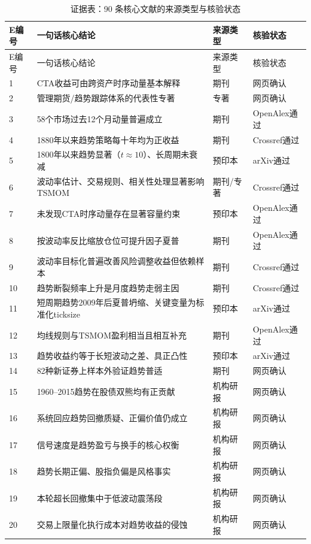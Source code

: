 \documentclass[12pt,a4paper]{ctexart}
\begin{document}
{\small\setlength{\tabcolsep}{4pt}\begin{longtable}{p{28.45pt}p{244.69pt}p{48.37pt}p{85.36pt}}
\caption{证据表：90 条核心文献的来源类型与核验状态}\label{tab:evidence}\\
\toprule
E编号 & 一句话核心结论 & 来源类型 & 核验状态 \\
\midrule
\endfirsthead
\toprule
E编号 & 一句话核心结论 & 来源类型 & 核验状态 \\
\midrule
\endhead
1 & CTA收益可由跨资产时序动量基本解释 & 期刊 & 网页确认 \\
2 & 管理期货/趋势跟踪体系的代表性专著 & 专著 & 网页确认 \\
3 & 58个市场过去12个月动量普遍成立 & 期刊 & OpenAlex通过 \\
4 & 1880年以来趋势策略每十年均为正收益 & 期刊 & Crossref通过 \\
5 & 1800年以来趋势显著（$t \approx 10$）、长周期未衰减 & 预印本 & arXiv通过 \\
6 & 波动率估计、交易规则、相关性处理显著影响TSMOM & 期刊/专著 & Crossref通过 \\
7 & 未发现CTA时序动量存在显著容量约束 & 预印本 & OpenAlex通过 \\
8 & 按波动率反比缩放仓位可提升因子夏普 & 期刊 & OpenAlex通过 \\
9 & 波动率目标化普遍改善风险调整收益但依赖样本 & 期刊 & Crossref通过 \\
10 & 趋势断裂频率上升是月度趋势走弱主因 & 期刊 & Crossref通过 \\
11 & 短周期趋势2009年后夏普坍缩、关键变量为标准化ticksize & 预印本 & arXiv通过 \\
12 & 均线规则与TSMOM盈利相当且相互补充 & 期刊 & OpenAlex通过 \\
13 & 趋势收益约等于长短波动之差、具正凸性 & 预印本 & arXiv通过 \\
14 & 82种新证券上样本外验证趋势普适 & 期刊 & 网页确认 \\
15 & 1960–2015趋势在股债双熊均有正贡献 & 机构研报 & 网页确认 \\
16 & 系统回应趋势回撤质疑、正偏价值仍成立 & 机构研报 & 网页确认 \\
17 & 信号速度是趋势盈亏与换手的核心权衡 & 机构研报 & 网页确认 \\
18 & 趋势长期正偏、股指负偏是风格事实 & 机构研报 & 网页确认 \\
19 & 本轮超长回撤集中于低波动震荡段 & 机构研报 & 网页确认 \\
20 & 交易上限量化执行成本对趋势收益的侵蚀 & 机构研报 & 网页确认 \\

\end{longtable}}
\end{document}
